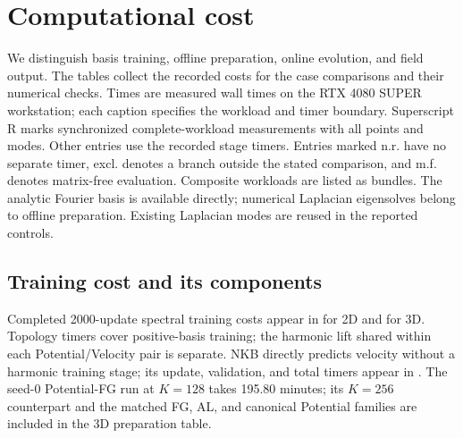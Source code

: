 
\section{Computational cost}
\label{app:runtime}
We distinguish basis training, offline preparation, online evolution, and field output.
The tables collect the recorded costs for the case comparisons and their numerical checks.
Times are measured wall times on the RTX 4080 SUPER workstation; each caption specifies
the workload and timer boundary. Superscript R marks synchronized complete-workload measurements with all points and modes. Other entries use the recorded stage timers. Entries marked n.r. have no separate timer, excl. denotes a branch outside the stated comparison, and m.f. denotes matrix-free evaluation. Composite workloads are listed as bundles.
The analytic Fourier basis is available directly; numerical Laplacian eigensolves
belong to offline preparation. Existing Laplacian modes are reused in the
reported controls.

\subsection{Training cost and its components}
Completed 2000-update spectral training costs appear in  for 2D and  for 3D. Topology timers cover positive-basis training; the harmonic lift shared within each Potential/Velocity pair is separate. NKB directly predicts velocity without a harmonic training stage; its update, validation, and total timers appear in . The seed-0 Potential-FG run at $K=128$ takes 195.80 minutes; its $K=256$ counterpart and the matched FG, AL, and canonical Potential families are included in the 3D preparation table.


